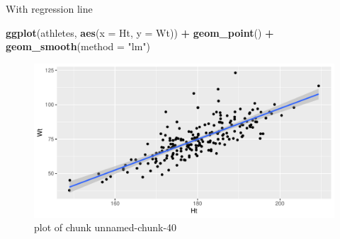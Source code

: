 \documentclass[ignorenonframetext,]{beamer}
\newenvironment{Shaded}{\begin{snugshade}}{\end{snugshade}}
\newcommand{\DataTypeTok}[1]{\textcolor[rgb]{0.13,0.29,0.53}{#1}}
\newcommand{\KeywordTok}[1]{\textcolor[rgb]{0.13,0.29,0.53}{\textbf{#1}}}
\newcommand{\NormalTok}[1]{#1}
\newcommand{\OperatorTok}[1]{\textcolor[rgb]{0.81,0.36,0.00}{\textbf{#1}}}
\newcommand{\StringTok}[1]{\textcolor[rgb]{0.31,0.60,0.02}{#1}}
\begin{document}
\begin{frame}[fragile]{With regression line}
\protect\hypertarget{with-regression-line}{}

\begin{Shaded}
\begin{Highlighting}[]
\KeywordTok{ggplot}\NormalTok{(athletes, }\KeywordTok{aes}\NormalTok{(}\DataTypeTok{x =}\NormalTok{ Ht, }\DataTypeTok{y =}\NormalTok{ Wt)) }\OperatorTok{+}
\StringTok{  }\KeywordTok{geom_point}\NormalTok{() }\OperatorTok{+}\StringTok{ }\KeywordTok{geom_smooth}\NormalTok{(}\DataTypeTok{method =} \StringTok{"lm"}\NormalTok{)}
\end{Highlighting}
\end{Shaded}

\begin{figure}
\centering
\includegraphics{figure/unnamed-chunk-40-1.pdf}
\caption{plot of chunk unnamed-chunk-40}
\end{figure}

\end{frame}
\end{document}
